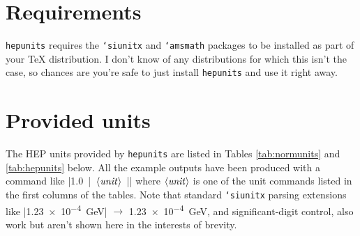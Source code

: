 \documentclass[12pt]{article}
\newcommand{\hepunits}{\texttt{hepunits}\xspace}
\newcommand{\texpkg}[1]{\texttt{\char`#1}}
\newcommand{\texgen}[1]{\ensuremath{\braket{\text{\emph{#1}}}}}
\begin{document}
\section{Requirements}
\hepunits requires the \texpkg{siunitx} and \texpkg{amsmath}
packages to be installed as part of your \TeX{} distribution. I don't know of
any distributions for which this isn't the case, so chances are you're safe to
just install \hepunits and use it right away.


\section{Provided units}
The HEP units provided by \hepunits are listed in Tables \ref{tab:normunits} and
\ref{tab:hepunits} below. All the example outputs have been produced with a
command like |\SI{1.0}{|\texgen{unit}|}| where \texgen{unit} is one of the unit
commands listed in the first columns of the tables. Note that standard
\texpkg{siunitx} parsing extensions like |\SI{1.23e-4}{\GeV}| $\to$
\SI{1.23e-4}{\GeV}, and significant-digit control, also work but aren't shown
here in the interests of brevity.
\end{document}
